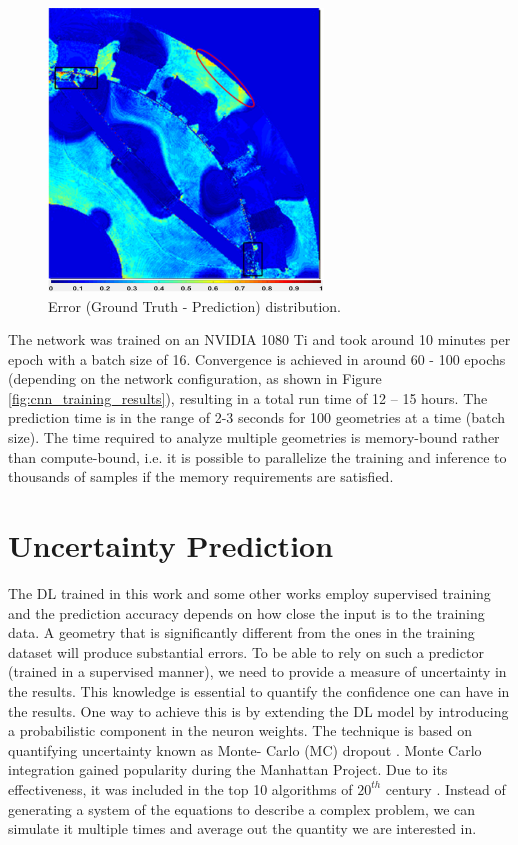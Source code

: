 \begin{figure}[h!]
    \centering
    \includegraphics[width=0.65\textwidth]{Figures/Chp2_CNN/error_cnn_predVsTarget.png}
    \caption{Error (Ground Truth - Prediction) distribution.}
    \label{fig:cnn_error_dist}
\end{figure}

The network was trained on an NVIDIA 1080 Ti and took around 10 minutes per epoch with a batch size of 16. Convergence is achieved in around 60 - 100 epochs (depending on the network configuration, as shown in Figure \ref{fig:cnn_training_results}), resulting in a total run time of 12 – 15 hours. The prediction time is in the range of 2-3 seconds for 100 geometries at a time (batch size). The time required to analyze multiple geometries is memory-bound rather than compute-bound, i.e. it is possible to parallelize the training and inference to thousands of samples if the memory requirements are satisfied.

\section{Uncertainty Prediction}

The DL trained in this work and some other works \parencite{tang2017study} employ supervised training and the prediction accuracy depends on how close the input is to the training data. A geometry that is significantly different from the ones in the training dataset will produce substantial errors. To be able to rely on such a predictor (trained in a supervised manner), we need to provide a measure of uncertainty in the results. This knowledge is essential to quantify the confidence one can have in the results. One way to achieve this is by extending the DL model by introducing a probabilistic component in the neuron weights.
The technique is based on quantifying uncertainty known as Monte- Carlo (MC) dropout \parencite{gal2016dropout}. Monte Carlo integration gained popularity during the Manhattan Project. Due to its effectiveness, it was included in the top 10 algorithms of $20^{th}$ century \parencite{Metropolis}. Instead of generating a system of the equations to describe a complex problem, we can simulate it multiple times and average out the quantity we are interested in.

